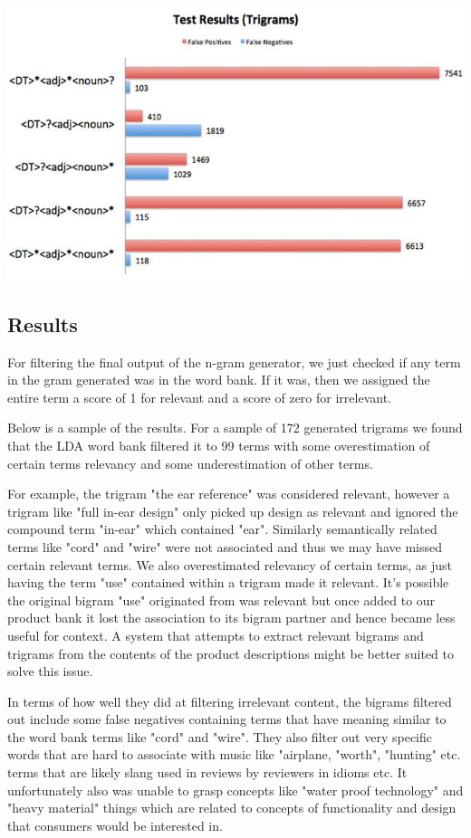 \documentclass{article}
\begin{document}
\includegraphics[scale = 0.35]{trigramsFalse.jpg}

\subsection{Results}
For filtering the final output of the n-gram generator, we just checked if any term in the gram generated was in the word bank. If it was, then we assigned the entire term a score of 1 for relevant and a score of zero for irrelevant.

Below is a sample of the results. For a sample of 172 generated trigrams we found that the LDA word bank filtered it to 99 terms with some overestimation of certain terms relevancy and some underestimation of other terms.

For example, the trigram "the ear reference" was considered relevant, however a trigram like "full in-ear design" only picked up design as relevant and ignored the compound term "in-ear" which contained "ear". Similarly semantically related terms like "cord" and "wire" were not associated and thus we may have missed certain relevant terms. We also overestimated relevancy of certain terms, as just having the term "use" contained within a trigram made it relevant. It's possible the original bigram "use" originated from was relevant but once added to our product bank it lost the association to its bigram partner and hence became less useful for context. A system that attempts to extract relevant bigrams and trigrams from the contents of the product descriptions might be better suited to solve this issue. 

In terms of how well they did at filtering irrelevant content, the bigrams filtered out include some false negatives containing terms that have meaning similar to the word bank terms like "cord" and "wire". They also filter out very specific words that are hard to associate with music like "airplane, "worth", "hunting" etc. terms that are likely slang used in reviews by reviewers in idioms etc. It unfortunately also was unable to grasp concepts like "water proof technology" and "heavy material" things which are related to concepts of functionality and design that consumers would be interested in. 
\end{document}
